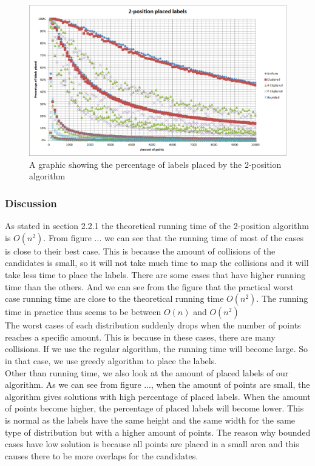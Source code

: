 \documentclass[crop=false,a4paper,oneside,11pt]{standalone}
\begin{document}
\begin{figure}[H]
 \centering
  \centerline{\includegraphics[scale = 0.5]{2PosLabelsPlaced.png}}
  \caption{A graphic showing the percentage of labels placed by the 2-position algorithm}
 \end{figure}

\subsubsection{Discussion}
As stated in section 2.2.1 the theoretical running time of the 2-position algorithm is $O(n^2)$. From figure ... we can see that the running time of most of the cases is close to their best case. This is because the amount of collisions of the candidates is small, so it will not take much time to map the collisions and it will take less time to place the labels. There are some cases that have higher running time than the others. And we can see from the figure that the practical worst case running time are close to the theoretical running time $O(n^2)$. The running time in practice thus seems to be between $O(n)$ and $O(n^2)$ \\
The worst cases of each distribution suddenly drops when the number of points reaches a specific amount. This is because in these cases, there are many collisions. If we use the regular algorithm, the running time will become large. So in that case, we use greedy algorithm to place the labels.\\
Other than running time, we also look at the amount of placed labels of our algorithm. As we can see from figure ..., when the amount of points are small, the algorithm gives solutions with high percentage of placed labels. When the amount of points become higher, the percentage of placed labels will become lower. This is normal as the labels have the same height and the same width for the same type of distribution but with a higher amount of points. The reason why bounded cases have low solution is because all points are placed in a small area and this causes there to be more overlaps for the candidates.\\
\end{document}
